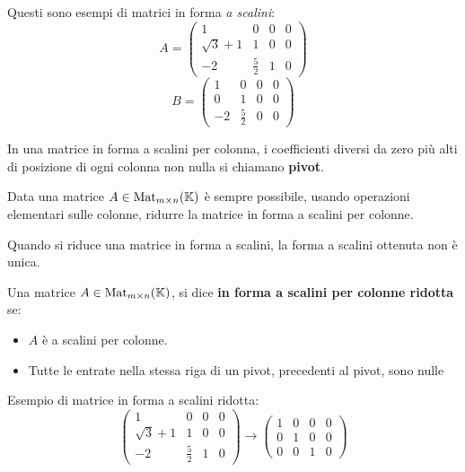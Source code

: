 \begin{example}
	Questi sono esempi di matrici in forma \emph{a scalini}:
	\[
		A = \begin{pmatrix}
			1            & 0           & 0 & 0 \\
			\sqrt{3} + 1 & 1           & 0 & 0 \\
			-2           & \frac{5}{2} & 1 & 0
		\end{pmatrix}
	\]
	\[
		B = \begin{pmatrix}
			1  & 0           & 0 & 0 \\
			0  & 1           & 0 & 0 \\
			-2 & \frac{5}{2} & 0 & 0
		\end{pmatrix}
	\]
\end{example}

\begin{definition}
	In una matrice in forma a scalini per colonna, i coefficienti diversi
	da zero più alti di posizione di ogni colonna non nulla si
	chiamano \textbf{pivot}.
\end{definition}

\begin{theorem}
	Data una matrice $A \in \operatorname{Mat}_{m \times n}(\mathbb{K})$ è sempre
	possibile, usando operazioni elementari sulle colonne, ridurre la
	matrice in forma a scalini per colonne.
\end{theorem}

\begin{observation}
	Quando si riduce una matrice in forma a scalini, la forma a scalini
	ottenuta non è unica.
\end{observation}

\begin{definition}
	Una matrice $A \in \operatorname{Mat}_{m \times n}(\mathbb{K})$, si dice \textbf{in forma a
		scalini per colonne ridotta} se:
	\begin{itemize}
		\item $A$ è a scalini per colonne.
		\item Tutte le entrate nella stessa riga di un pivot, precedenti al pivot,
		      sono nulle
	\end{itemize}
\end{definition}

\begin{example}
	Esempio di matrice in forma a scalini ridotta:
	\[
		\begin{pmatrix}
			1            & 0           & 0 & 0 \\
			\sqrt{3} + 1 & 1           & 0 & 0 \\
			-2           & \frac{5}{2} & 1 & 0
		\end{pmatrix} \rightarrow
		\begin{pmatrix}
			1 & 0 & 0 & 0 \\
			0 & 1 & 0 & 0 \\
			0 & 0 & 1 & 0
		\end{pmatrix}
	\]
\end{example}


